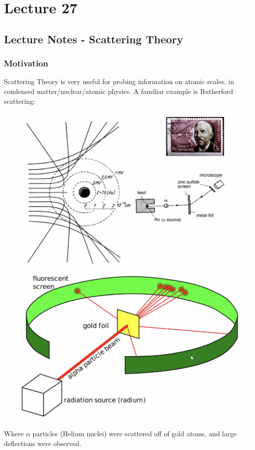 \section{Lecture 27}
\subsection{Lecture Notes - Scattering Theory}
\subsubsection{Motivation}
Scattering Theory is very useful for probing information on atomic scales, in condensed matter/nuclear/atomic physics. A familiar example is Rutherford scattering:
\begin{center}
    \includegraphics[scale=0.5]{Lecture-27/l27-img1.png}
    \includegraphics[scale=0.5]{Lecture-27/l27-img2.png}
\end{center}
Where $\alpha$ particles (Helium nuclei) were scattered off of gold atoms, and large deflections were observed.

